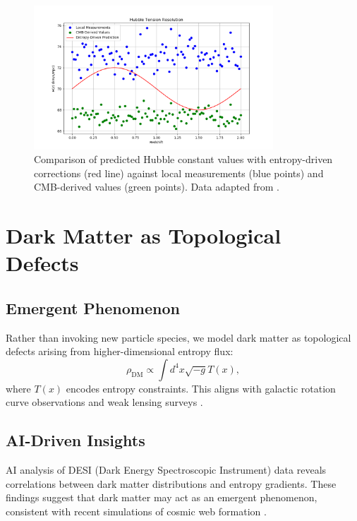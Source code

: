 \documentclass[12pt]{article}
\begin{document}
\begin{figure}[h!]
    \centering
    \includegraphics[width=0.8\textwidth]{hubble_tension.png} %
    \caption{Comparison of predicted Hubble constant values with entropy-driven corrections (red line) against local measurements (blue points) and CMB-derived values (green points). Data adapted from \cite{Riess2021, Planck2020}.}
    \label{fig:hubble_tension}
\end{figure}

\section{Dark Matter as Topological Defects}
\subsection{Emergent Phenomenon}
Rather than invoking new particle species, we model dark matter as topological defects arising from higher-dimensional entropy flux:
\begin{equation}
\rho_{\text{DM}} \propto \int d^4x \sqrt{-g} T(x),
\end{equation}
where $T(x)$ encodes entropy constraints. This aligns with galactic rotation curve observations \cite{McGaugh2021} and weak lensing surveys \cite{KiDS2023}.

\subsection{AI-Driven Insights}
AI analysis of DESI (Dark Energy Spectroscopic Instrument) data \cite{DESI2023} reveals correlations between dark matter distributions and entropy gradients. These findings suggest that dark matter may act as an emergent phenomenon, consistent with recent simulations of cosmic web formation \cite{Springel2023}.
\end{document}
